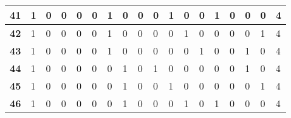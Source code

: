 \begin{center}
\begin{longtable}{|P{0.3cm}|P{0.3cm}|P{0.3cm}|P{0.3cm}|P{0.3cm}|P{0.3cm}|P{0.3cm}|P{0.3cm}|P{0.3cm}|P{0.3cm}|P{0.3cm}|P{0.3cm}|P{0.3cm}|P{0.3cm}|P{0.3cm}|P{0.3cm}|P{0.3cm}|P{1.4cm}|}
\textbf{41}                        & 1                     & 0                     & 0                     & 0                     & 0                     & 1                     & 0                     & 0                     & 0                     & 1                     & 0                     & 0                     & 1                     & 0                     & 0                     & 0                     & 4                     \\ \hline
\textbf{42}                        & 1                     & 0                     & 0                     & 0                     & 0                     & 1                     & 0                     & 0                     & 0                     & 0                     & 1                     & 0                     & 0                     & 0                     & 0                     & 1                     & 4                     \\ \hline
\textbf{43}                        & 1                     & 0                     & 0                     & 0                     & 0                     & 1                     & 0                     & 0                     & 0                     & 0                     & 0                     & 1                     & 0                     & 0                     & 1                     & 0                     & 4                     \\ \hline
\textbf{44}                        & 1                     & 0                     & 0                     & 0                     & 0                     & 0                     & 1                     & 0                     & 1                     & 0                     & 0                     & 0                     & 0                     & 0                     & 1                     & 0                     & 4                     \\ \hline
\textbf{45}                        & 1                     & 0                     & 0                     & 0                     & 0                     & 0                     & 1                     & 0                     & 0                     & 1                     & 0                     & 0                     & 0                     & 0                     & 0                     & 1                     & 4                     \\ \hline
\textbf{46}                        & 1                     & 0                     & 0                     & 0                     & 0                     & 0                     & 1                     & 0                     & 0                     & 0                     & 1                     & 0                     & 1                     & 0                     & 0                     & 0                     & 4                     \\ \hline

\end{longtable}
\end{center}
